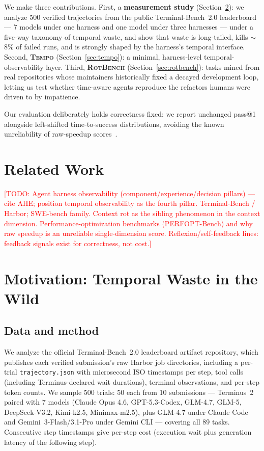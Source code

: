 \documentclass[10pt]{article}
\newcommand{\todo}[1]{\textcolor{red}{[TODO: #1]}}
\newcommand{\tempo}{\textsc{Tempo}}
\begin{document}
We make three contributions. First, a \textbf{measurement study}
(Section~\ref{sec:measurement}): we analyze 500 verified trajectories from the
public Terminal-Bench~2.0 leaderboard --- 7 models under one harness and one
model under three harnesses --- under a five-way taxonomy of temporal waste,
and show that waste is long-tailed, kills $\sim$8\% of failed runs, and is
strongly shaped by the harness's temporal interface. Second, \textbf{\tempo{}}
(Section~\ref{sec:tempo}): a minimal, harness-level temporal-observability
layer. Third, \textbf{\textsc{RotBench}} (Section~\ref{sec:rotbench}): tasks
mined from real repositories whose maintainers historically fixed a decayed
development loop, letting us test whether time-aware agents reproduce the
refactors humans were driven to by impatience.

Our evaluation deliberately holds correctness fixed: we report unchanged
pass@1 alongside left-shifted time-to-success distributions, avoiding the
known unreliability of raw-speedup scores~\citep{todo-perfopt}.

\section{Related Work}
\label{sec:related}

\todo{Agent harness observability (component/experience/decision pillars) ---
cite AHE; position temporal observability as the fourth pillar. Terminal-Bench
/ Harbor; SWE-bench family. Context rot as the sibling phenomenon in the
context dimension. Performance-optimization benchmarks (PERFOPT-Bench) and why
raw speedup is an unreliable single-dimension score. Reflexion/self-feedback
lines: feedback signals exist for correctness, not cost.}

\section{Motivation: Temporal Waste in the Wild}
\label{sec:measurement}

\subsection{Data and method}

We analyze the official Terminal-Bench~2.0 leaderboard artifact repository,
which publishes each verified submission's raw Harbor job directories,
including a per-trial \texttt{trajectory.json} with microsecond ISO timestamps
per step, tool calls (including Terminus-declared wait durations), terminal
observations, and per-step token counts. We sample 500 trials: 50 each from 10
submissions --- Terminus~2 paired with 7 models (Claude Opus 4.6, GPT-5.3-Codex,
GLM-4.7, GLM-5, DeepSeek-V3.2, Kimi-k2.5, Minimax-m2.5), plus GLM-4.7 under
Claude Code and Gemini~3-Flash/3.1-Pro under Gemini CLI --- covering all 89
tasks. Consecutive step timestamps give per-step cost (execution wait plus
generation latency of the following step).
\end{document}
